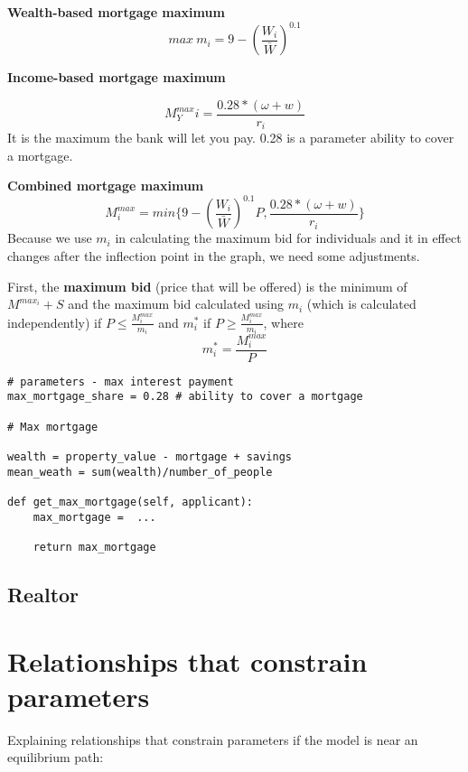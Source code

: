 \textbf{Wealth-based  mortgage maximum} 
 \[max\ m_i = 9-\left(\frac{W_i}{\bar W}\right)^{0.1} \]


\textbf{Income-based  mortgage maximum}

\[M^{max}_Yi = \frac{0.28*(\omega+w)}{r_i}\] It is the maximum the bank will let you pay.  0.28 is a parameter \gls{ability to cover a mortgage}.
 
\textbf{Combined  mortgage maximum}
\[ M_i^{max} = min \{9-\left(\frac{W_i}{\bar W}\right)^{0.1}P,  \frac{0.28*(\omega+w)}{r_i} \}\]
Because we use $m_i$ in calculating the maximum bid for individuals and it in effect changes after the inflection point in the graph, we need some adjustments. 

First, the \textbf{maximum bid} (price that will be offered) is the minimum of $M^{max_i} +S$ and the maximum bid calculated using $m_i$ (which is calculated independently) if 
$P\le \frac{M_i^{max}}{m_i}$ 
and $m_i^*$ if 
$P\ge \frac{M_i^{max}}{m_i}$, where 
\[m_i^*=\frac{M_i^{max}}{P}\]

\begin{lstlisting}
# parameters - max interest payment 
max_mortgage_share = 0.28 # ability to cover a mortgage

# Max mortgage

wealth = property_value - mortgage + savings
mean_weath = sum(wealth)/number_of_people

def get_max_mortgage(self, applicant):
    max_mortgage =  ...
    
    return max_mortgage
\end{lstlisting}






\subsection{Realtor}




\section{Relationships that constrain parameters }

Explaining relationships that constrain parameters if the model is near an equilibrium path: 

